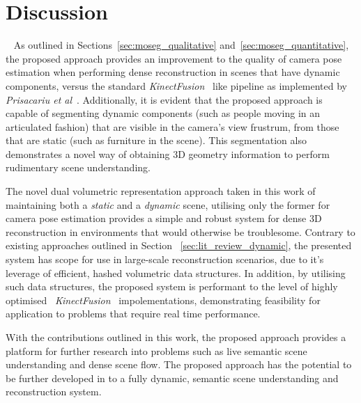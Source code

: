 
\section{Discussion}
~\label{sec:moseg_discussion}
As outlined in Sections~\ref{sec:moseg_qualitative} and~\ref{sec:moseg_quantitative}, the 
proposed approach provides an improvement to the quality of camera pose estimation when 
performing dense reconstruction in scenes that have dynamic components, versus the 
standard \textit{KinectFusion}~\cite{Newcombe2011} like pipeline as implemented by 
\textit{Prisacariu et al}~\cite{Prisacariu2014}. Additionally, it is evident that the 
proposed approach is capable of segmenting dynamic components (such as people moving in 
an articulated fashion) that are visible in the camera's view frustrum, from those that 
are static (such as furniture in the scene). This segmentation also demonstrates a novel 
way of obtaining 3D geometry information to perform rudimentary scene understanding.

The novel dual volumetric representation approach taken in this work of maintaining both a 
\textit{static} and a \textit{dynamic} scene, utilising only the former for camera pose 
estimation provides a simple and robust system for dense 3D reconstruction in environments 
that would otherwise be troublesome. Contrary to existing approaches outlined in Section 
~\ref{sec:lit_review_dynamic}, the presented system has scope for use in large-scale 
reconstruction scenarios, due to it's leverage of efficient, hashed volumetric data structures. 
In addition, by utilising such data structures, the proposed system is performant to the 
level of highly optimised~\cite{Prisacariu2014} \textit{KinectFusion}~\cite{Newcombe2011} 
impolementations, demonstrating feasibility for application to problems that require 
real time performance.

With the contributions outlined in this work, the proposed approach provides a platform 
for further research into problems such as live semantic scene understanding and dense scene 
flow. The proposed approach has the potential to be further developed in to a fully dynamic, 
semantic scene understanding and reconstruction system.